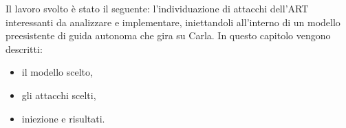 Il lavoro svolto è stato il seguente:  l'individuazione di attacchi dell'ART interessanti da analizzare e implementare, iniettandoli all'interno di un modello preesistente di guida
autonoma che gira su Carla. In questo capitolo vengono descritti:\begin{itemize}
    \item il modello scelto,
    \item gli attacchi scelti,
    \item iniezione e risultati.
\end{itemize}






